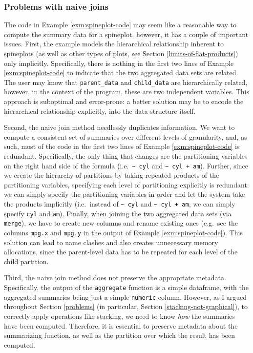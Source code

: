 \documentclass[
  openany]{book}
\theoremstyle{definition}
\theoremstyle{definition}
\theoremstyle{definition}
\theoremstyle{definition}
\theoremstyle{remark}
\begin{document}
\subsubsection{Problems with naive joins}\label{problems-with-naive-joins}

The code in Example \ref{exm:spineplot-code} may seem like a reasonable way to compute the summary data for a spineplot, however, it has a couple of important issues. First, the example models the hierarchical relationship inherent to spineplots (as well as other types of plots, see Section \ref{limits-of-flat-products}) only implicitly. Specifically, there is nothing in the first two lines of Example \ref{exm:spineplot-code} to indicate that the two aggregated data sets are related. The user may know that \texttt{parent\_data} and \texttt{child\_data} are hierarchically related, however, in the context of the program, these are two independent variables. This approach is suboptimal and error-prone: a better solution may be to encode the hierarchical relationship explicitly, into the data structure itself.

Second, the naive join method needlessly duplicates information. We want to compute a consistent set of summaries over different levels of granularity, and, as such, most of the code in the first two lines of Example \ref{exm:spineplot-code} is redundant. Specifically, the only thing that changes are the partitioning variables on the right hand side of the formula (i.e.~\texttt{\textasciitilde{}\ cyl} and \texttt{\textasciitilde{}\ cyl\ +\ am}). Further, since we create the hierarchy of partitions by taking repeated products of the partitioning variables, specifying each level of partitioning explicitly is redundant: we can simply specify the partitioning variables in order and let the system take the products implicitly (i.e.~instead of \texttt{\textasciitilde{}\ cyl} and \texttt{\textasciitilde{}\ cyl\ +\ am}, we can simply specify \texttt{cyl} and \texttt{am}). Finally, when joining the two aggregated data sets (via \texttt{merge}), we have to create new columns and rename existing ones (e.g.~see the columns \texttt{mpg.x} and \texttt{mpg.y} in the output of Example \ref{exm:spineplot-code}). This solution can lead to name clashes and also creates unnecessary memory allocations, since the parent-level data has to be repeated for each level of the child partition.

Third, the naive join method does not preserve the appropriate metadata. Specifically, the output of the \texttt{aggregate} function is a simple dataframe, with the aggregated summaries being just a simple \texttt{numeric} column. However, as I argued throughout Section \ref{problems} (in particular, Section \ref{stacking-not-graphical}), to correctly apply operations like stacking, we need to know \emph{how} the summaries have been computed. Therefore, it is essential to preserve metadata about the summarizing function, as well as the partition over which the result has been computed.
\end{document}
